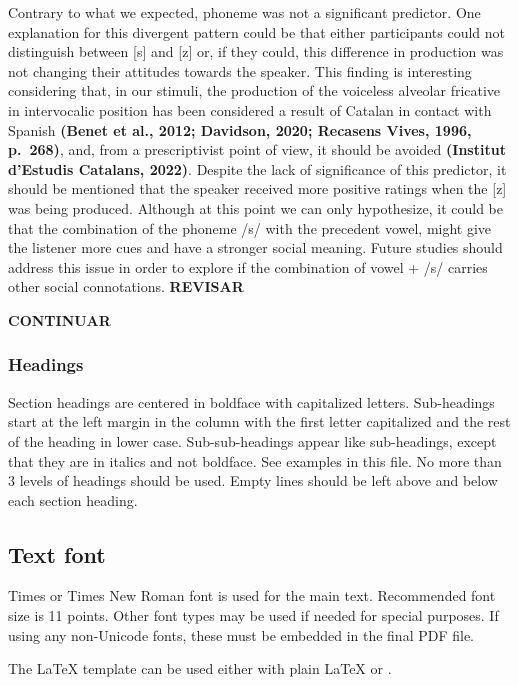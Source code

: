 \documentclass[
  a4paper,
  11pt,
  twocolumn]{article}
\begin{document}
Contrary to what we expected, phoneme was not a significant predictor.
One explanation for this divergent pattern could be that either
participants could not distinguish between {[}s{]} and {[}z{]} or, if
they could, this difference in production was not changing their
attitudes towards the speaker. This finding is interesting considering
that, in our stimuli, the production of the voiceless alveolar fricative
in intervocalic position has been considered a result of Catalan in
contact with Spanish \textbf{(Benet et al., 2012; Davidson, 2020;
Recasens Vives, 1996, p.~268)}, and, from a prescriptivist point of
view, it should be avoided \textbf{(Institut d'Estudis Catalans, 2022)}.
Despite the lack of significance of this predictor, it should be
mentioned that the speaker received more positive ratings when the
{[}z{]} was being produced. Although at this point we can only
hypothesize, it could be that the combination of the phoneme /s/ with
the precedent vowel, might give the listener more cues and have a
stronger social meaning. Future studies should address this issue in
order to explore if the combination of vowel + /s/ carries other social
connotations. \textbf{REVISAR}

\textbf{CONTINUAR}

\subsubsection{Headings}

Section headings are centered in boldface with capitalized letters.
Sub-headings start at the left margin in the column with the first
letter capitalized and the rest of the heading in lower case.
Sub-sub-headings appear like sub-headings, except that they are in
italics and not boldface. See examples in this file. No more than 3
levels of headings should be used. Empty lines should be left above and
below each section heading.

\subsection{Text font}

Times or Times New Roman font is used for the main text. Recommended
font size is 11 points. Other font types may be used if needed for
special purposes. If using any non-Unicode fonts, these must be embedded
in the final PDF file.

The \LaTeX{} template can be used either with plain \LaTeX{} or
\XeLaTeX.
\end{document}
